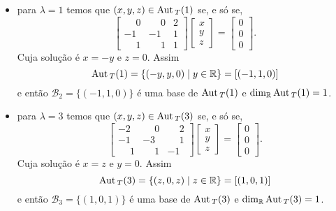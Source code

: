 \begin{exemplo}
\begin{enumerate}[label={\arabic*})]
\begin{solucao}
\begin{itemize}
                    \item para $\lambda = 1$ temos que $(x,y,z) \in {\rm Aut\,}_T(1)$ se, e s\'o se,
                        \[
                            \begin{bmatrix}
                                \phantom{-}0 & \phantom{-}0 & 2\\
                                -1 & -1 & 1\\
                                \phantom{-}1 & \phantom{-}1 & 1
                            \end{bmatrix}\begin{bmatrix}
                                x\\y\\z
                            \end{bmatrix} = \begin{bmatrix}
                                0\\0\\0
                            \end{bmatrix}.
                        \]
                        Cuja solu\c{c}ão é $x = -y$ e $z = 0$. Assim
                        \[
                            {\rm Aut\,}_T(1) = \{(-y,y,0) \mid y \in \mathbb{R}\} = [(-1,1,0)]
                        \]
                        e ent\~ao $\mathcal{B}_2 = \{(-1,1,0)\}$ \'e uma base de ${\rm Aut\,}_T(1)$ e $\dim_{\mathbb{R}}{\rm Aut\,}_T(1) = 1$.

                    \item para $\lambda = 3$ temos que $(x,y,z) \in {\rm Aut\,}_T(3)$ se, e s\'o se,
                        \[
                            \begin{bmatrix}
                                -2 & \phantom{-}0 & \phantom{-}2\\
                                -1 & -3 & \phantom{-}1\\
                                \phantom{-}1 & \phantom{-}1 & -1
                            \end{bmatrix}\begin{bmatrix}
                                x\\y\\z
                            \end{bmatrix} = \begin{bmatrix}
                                0\\0\\0
                            \end{bmatrix}.
                        \]
                    Cuja solu\c{c}ão é $x = z$ e $y = 0$. Assim
                    \[
                        {\rm Aut\,}_T(3) = \{(z,0,z) \mid z \in \mathbb{R}\} = [(1,0,1)]
                    \]
                    e ent\~ao $\mathcal{B}_3 = \{(1,0,1)\}$ \'e uma base de ${\rm Aut\,}_T(3)$ e $\dim_{\mathbb{R}}{\rm Aut\,}_T(3) = 1$.
            \end{itemize}


\end{solucao}
\end{enumerate}
\end{exemplo}
